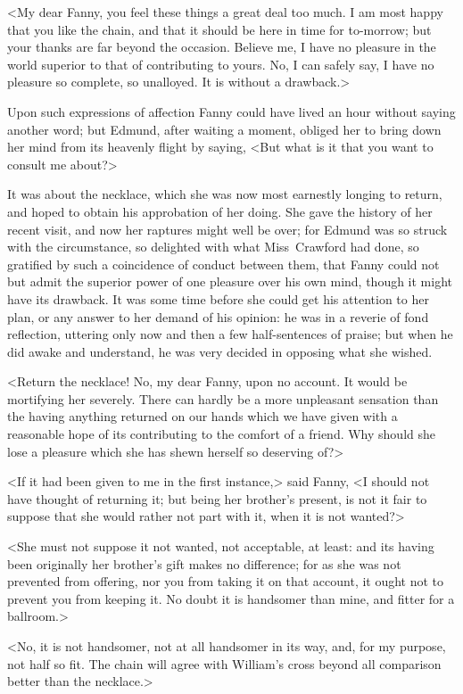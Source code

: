 <My dear Fanny, you feel these things a great deal too much. I am most happy that you like the chain, and that it should be here in time for to-morrow; but your thanks are far beyond the occasion. Believe me, I have no pleasure in the world superior to that of contributing to yours. No, I can safely say, I have no pleasure so complete, so unalloyed. It is without a drawback.>

Upon such expressions of affection Fanny could have lived an hour without saying another word; but Edmund, after waiting a moment, obliged her to bring down her mind from its heavenly flight by saying, <But what is it that you want to consult me about?>

It was about the necklace, which she was now most earnestly longing to return, and hoped to obtain his approbation of her doing. She gave the history of her recent visit, and now her raptures might well be over; for Edmund was so struck with the circumstance, so delighted with what Miss~Crawford had done, so gratified by such a coincidence of conduct between them, that Fanny could not but admit the superior power of one pleasure over his own mind, though it might have its drawback. It was some time before she could get his attention to her plan, or any answer to her demand of his opinion: he was in a reverie of fond reflection, uttering only now and then a few half-sentences of praise; but when he did awake and understand, he was very decided in opposing what she wished.

<Return the necklace! No, my dear Fanny, upon no account. It would be mortifying her severely. There can hardly be a more unpleasant sensation than the having anything returned on our hands which we have given with a reasonable hope of its contributing to the comfort of a friend. Why should she lose a pleasure which she has shewn herself so deserving of?>

<If it had been given to me in the first instance,> said Fanny, <I should not have thought of returning it; but being her brother's present, is not it fair to suppose that she would rather not part with it, when it is not wanted?>

<She must not suppose it not wanted, not acceptable, at least: and its having been originally her brother's gift makes no difference; for as she was not prevented from offering, nor you from taking it on that account, it ought not to prevent you from keeping it. No doubt it is handsomer than mine, and fitter for a ballroom.>

<No, it is not handsomer, not at all handsomer in its way, and, for my purpose, not half so fit. The chain will agree with William's cross beyond all comparison better than the necklace.>

